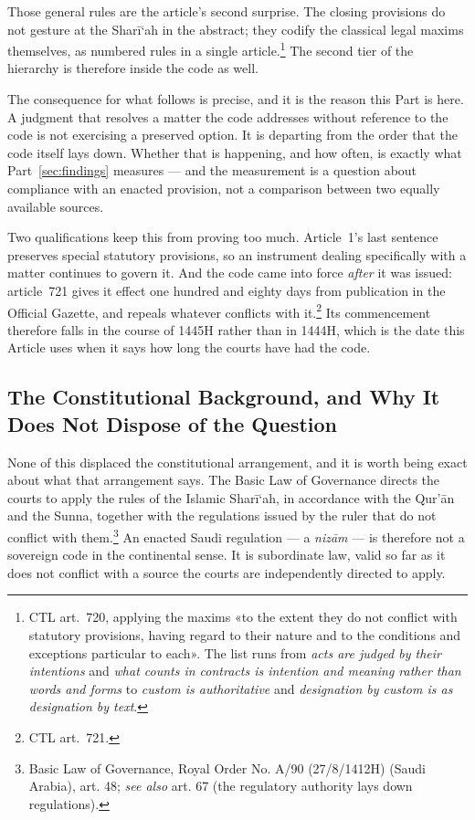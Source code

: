 \documentclass[12pt]{article}
\begin{document}
Those general rules are the article's second surprise. The closing provisions
do not gesture at the Shar\=i`ah in the abstract; they codify the classical
legal maxims themselves, as numbered rules in a single
article.\footnote{CTL art.~720, applying the maxims «to the extent they do not
conflict with statutory provisions, having regard to their nature and to the
conditions and exceptions particular to each». The list runs from \emph{acts
are judged by their intentions} and \emph{what counts in contracts is
intention and meaning rather than words and forms} to \emph{custom is
authoritative} and \emph{designation by custom is as designation by text}.}
The second tier of the hierarchy is therefore inside the code as well.

The consequence for what follows is precise, and it is the reason this Part is
here. A judgment that resolves a matter the code addresses without reference
to the code is not exercising a preserved option. It is departing from the
order that the code itself lays down. Whether that is happening, and how
often, is exactly what Part~\ref{sec:findings} measures --- and the measurement is a question
about compliance with an enacted provision, not a comparison between two
equally available sources.

Two qualifications keep this from proving too much. Article~1's last sentence
preserves special statutory provisions, so an instrument dealing specifically
with a matter continues to govern it. And the code came into force
\emph{after} it was issued: article~721 gives it effect one hundred and eighty
days from publication in the Official Gazette, and repeals whatever conflicts
with it.\footnote{CTL art.~721.} Its commencement therefore falls in the
course of 1445H rather than in 1444H, which is the date this Article uses when
it says how long the courts have had the code.

\subsection{The Constitutional Background, and Why It Does Not Dispose of the
Question}

None of this displaced the constitutional arrangement, and it is worth being
exact about what that arrangement says. The Basic Law of Governance directs
the courts to apply the rules of the Islamic Shar\=i`ah, in accordance with
the Qur'\=an and the Sunna, together with the regulations issued by the ruler
that do not conflict with them.\footnote{Basic Law of Governance, Royal Order
No. A/90 (27/8/1412H) (Saudi Arabia), art. 48; \emph{see also} art. 67 (the
regulatory authority lays down regulations).} An enacted Saudi regulation ---
a \emph{niz\=am} --- is therefore not a sovereign code in the continental
sense. It is subordinate law, valid so far as it does not conflict with a
source the courts are independently directed to apply.
\end{document}
